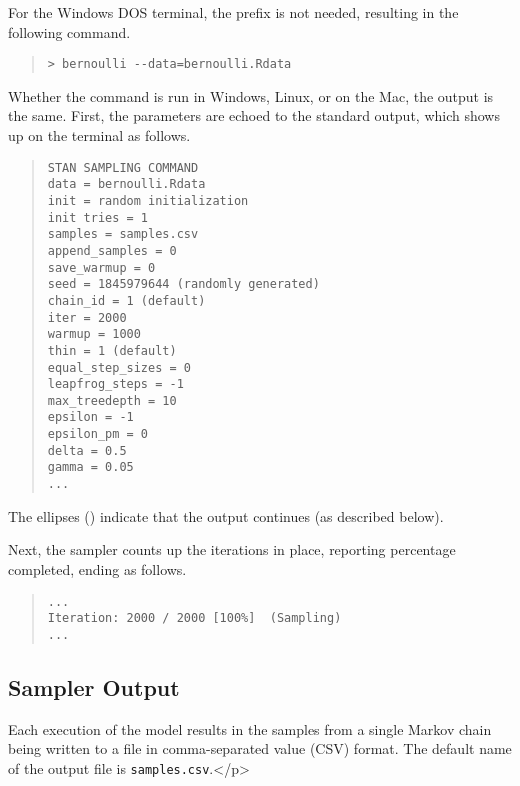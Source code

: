 For the Windows DOS terminal, the  prefix is not needed,
resulting in the following command.
%
\begin{quote}
\begin{Verbatim}[fontshape=sl]
> bernoulli --data=bernoulli.Rdata
\end{Verbatim}
\end{quote}
%
Whether the command is run in Windows, Linux, or on the Mac, the
output is the same.  First, the parameters are echoed to the standard output,
which shows up on the terminal as follows.
%
\begin{quote}
\begin{Verbatim}
STAN SAMPLING COMMAND
data = bernoulli.Rdata
init = random initialization
init tries = 1
samples = samples.csv
append_samples = 0
save_warmup = 0
seed = 1845979644 (randomly generated)
chain_id = 1 (default)
iter = 2000
warmup = 1000
thin = 1 (default)
equal_step_sizes = 0
leapfrog_steps = -1
max_treedepth = 10
epsilon = -1
epsilon_pm = 0
delta = 0.5
gamma = 0.05
...
\end{Verbatim}
\end{quote}
%
The ellipses () indicate that the output continues (as
described below).

Next, the sampler counts up the iterations in place, reporting
percentage completed, ending as follows.
%
\begin{quote}
\begin{Verbatim}
...
Iteration: 2000 / 2000 [100%]  (Sampling)
...
\end{Verbatim}
\end{quote}

\subsection{Sampler Output}

Each execution of the model results in the samples from a single
Markov chain being written to a file in comma-separated value (CSV) format.
The default name of the output file is \nolinkurl{samples.csv}.</p>

